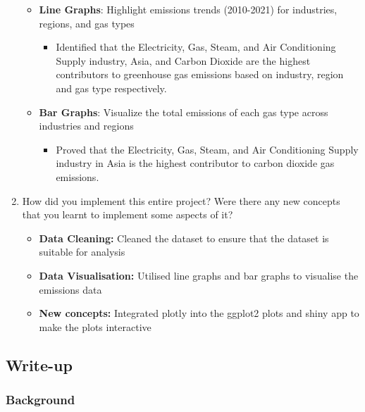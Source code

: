 \documentclass[
]{article}
\providecommand{\tightlist}{%
  \setlength{\itemsep}{0pt}\setlength{\parskip}{0pt}}
\begin{document}
\begin{enumerate}
  \begin{itemize}
  \item
    \textbf{Line Graphs}: Highlight emissions trends (2010-2021) for
    industries, regions, and gas types

    \begin{itemize}
    \tightlist
    \item
      Identified that the Electricity, Gas, Steam, and Air Conditioning
      Supply industry, Asia, and Carbon Dioxide are the highest
      contributors to greenhouse gas emissions based on industry, region
      and gas type respectively.
    \end{itemize}
  \item
    \textbf{Bar Graphs}: Visualize the total emissions of each gas type
    across industries and regions

    \begin{itemize}
    \tightlist
    \item
      Proved that the Electricity, Gas, Steam, and Air Conditioning
      Supply industry in Asia is the highest contributor to carbon
      dioxide gas emissions.
    \end{itemize}
  \end{itemize}
\item
  How did you implement this entire project? Were there any new concepts
  that you learnt to implement some aspects of it?

  \begin{itemize}
  \item
    \textbf{Data Cleaning:} Cleaned the dataset to ensure that the
    dataset is suitable for analysis
  \item
    \textbf{Data Visualisation:} Utilised line graphs and bar graphs to
    visualise the emissions data
  \item
    \textbf{New concepts:} Integrated plotly into the ggplot2 plots and
    shiny app to make the plots interactive
  \end{itemize}
\end{enumerate}

\hypertarget{write-up}{%
\subsection{Write-up}\label{write-up}}

\hypertarget{background}{%
\subsubsection{Background}\label{background}}
\end{document}
